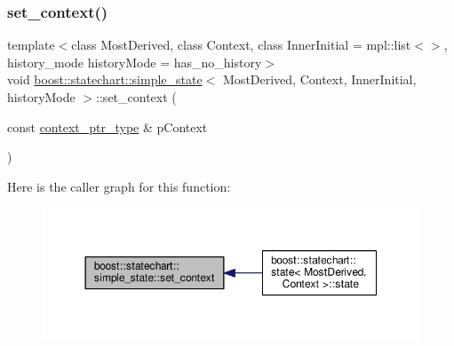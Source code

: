 \mbox{\label{classboost_1_1statechart_1_1simple__state_a542332ad88c14626cd34459cea2ce11c}} 
\subsubsection{\texorpdfstring{set\+\_\+context()}{set\_context()}}
{\footnotesize\ttfamily template$<$class Most\+Derived, class Context, class Inner\+Initial = mpl\+::list$<$$>$, history\+\_\+mode history\+Mode = has\+\_\+no\+\_\+history$>$ \\
void \mbox{\hyperlink{classboost_1_1statechart_1_1simple__state}{boost\+::statechart\+::simple\+\_\+state}}$<$ Most\+Derived, Context, Inner\+Initial, history\+Mode $>$\+::set\+\_\+context (\begin{DoxyParamCaption}\item[{const \mbox{\hyperlink{classboost_1_1statechart_1_1simple__state_ac7e361322d53b3f57976ff23056b59e7}{context\+\_\+ptr\+\_\+type}} \&}]{p\+Context }\end{DoxyParamCaption})\hspace{0.3cm}{\ttfamily [inline]}}

Here is the caller graph for this function\+:
\nopagebreak
\begin{figure}[H]
\begin{center}
\leavevmode
\includegraphics[width=350pt]{classboost_1_1statechart_1_1simple__state_a542332ad88c14626cd34459cea2ce11c_icgraph}
\end{center}
\end{figure}
\mbox{\label{classboost_1_1statechart_1_1simple__state_a371f219e75f23182309e4f2ecc71d399}} 
